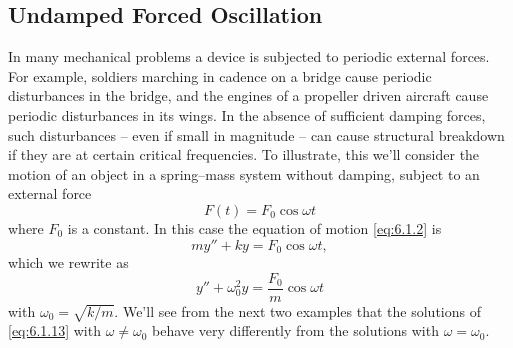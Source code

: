 \documentclass{ximera}
\begin{document}
 
\subsection*{Undamped Forced Oscillation}
 
In many mechanical problems a device is subjected to periodic external
forces. For example, soldiers marching in cadence on a bridge cause
periodic disturbances in the bridge, and the engines of a propeller
driven aircraft cause periodic disturbances in its wings. In the
absence of sufficient damping forces, such disturbances -- even if
small in magnitude -- can cause structural breakdown if they are at
certain critical frequencies. To illustrate, this we'll consider the
motion of an object in a spring--mass system without damping, subject
to an external force
$$
F(t)=F_0\cos\omega t
$$
where $F_0$ is a constant. In this case the equation of motion
\eqref{eq:6.1.2} is
$$
my''+ky=F_0\cos\omega t,
$$
which we rewrite  as
\begin{equation}\label{eq:6.1.13}
y''+\omega_0^2y=\frac{F_0}{m}\cos\omega t
\end{equation}
with $\omega_0=\sqrt{k/m}$.
We'll see from the next two examples that the solutions of
\eqref{eq:6.1.13}
with $\omega\ne\omega_0$ behave very differently from the solutions with
$\omega=\omega_0$.
 
 
 
\end{document}
